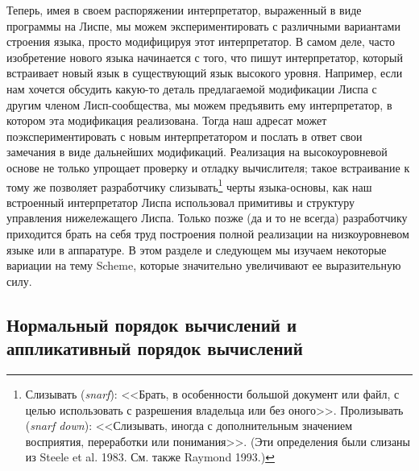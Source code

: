 Теперь, 
имея в своем распоряжении интерпретатор, выраженный в виде
программы на Лиспе, мы можем экспериментировать с различными
вариантами строения языка, просто модифицируя этот интерпретатор.  В
самом деле, часто изобретение нового языка начинается с того, что пишут
интерпретатор, который встраивает новый язык в существующий язык
высокого уровня.  Например, если нам хочется обсудить какую-то деталь
предлагаемой модификации Лиспа с другим членом Лисп-сообщества, мы можем
предъявить ему интерпретатор, в котором эта модификация
реализована.  Тогда наш адресат может поэкспериментировать с новым интерпретатором
и послать в ответ свои замечания в виде дальнейших модификаций.
Реализация на высокоуровневой основе не только упрощает проверку и
отладку вычислителя; такое встраивание к тому же позволяет
разработчику 
слизывать\footnote{Слизывать 
({\em snarf}): <<Брать, в особенности
большой документ или файл, с целью использовать с разрешения владельца
или без оного>>. Пролизывать ({\em snarf down}): <<Слизывать,
иногда с дополнительным значением восприятия, переработки или
понимания>>. (Эти определения были слизаны из 
Steele et al. 1983.
См. также Raymond 1993.)}
черты языка-основы, как наш встроенный интерпретатор Лиспа
использовал примитивы и структуру управления нижележащего Лиспа.
Только позже (да и то не всегда) разработчику приходится
брать на себя труд построения полной реализации на низкоуровневом
языке или в аппаратуре.  В этом разделе и следующем мы изучаем
некоторые вариации на тему Scheme, которые значительно увеличивают ее
выразительную силу.

\subsection{Нормальный порядок вычислений и аппликативный порядок 
вычислений}
\label{NORMAL-ORDER-AND-APPLICATIVE-ORDER}%


